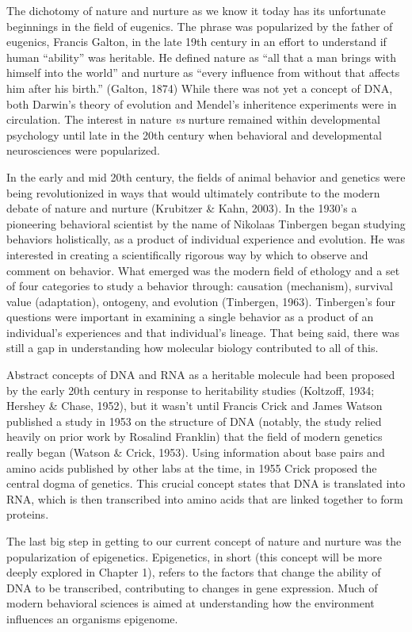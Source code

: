 \documentclass[12pt,twoside]{reedthesis}
\begin{document}
The dichotomy of nature and nurture as we know it today has its unfortunate beginnings in
the field of eugenics. The phrase was popularized by the father of eugenics, Francis
Galton, in the late 19th century in an effort to understand if human ``ability''
was heritable. He defined nature as ``all that a man brings with himself into
the world'' and nurture as ``every influence from without that affects him after
his birth.'' (Galton, 1874) While there was not yet a concept of DNA, both
Darwin's theory of evolution and Mendel's inheritence experiments were in
circulation. The interest in nature \textit{vs} nurture remained within developmental
psychology until late in the 20th century when behavioral and developmental
neurosciences were popularized.

In the early and mid 20th century, the fields of animal behavior and
genetics were being revolutionized in ways that would ultimately contribute to the modern debate of
nature and nurture (Krubitzer \& Kahn, 2003). In the 1930's a pioneering behavioral scientist by the name of Nikolaas Tinbergen began
studying behaviors holistically, as a product of individual
experience and evolution. He was interested in creating a scientifically
rigorous way by which to observe and comment on behavior.
What emerged was the modern field of ethology and a set of four categories to
study a behavior through: causation (mechanism), survival value (adaptation),
ontogeny, and evolution (Tinbergen, 1963).
Tinbergen's four questions were important in examining a single behavior as a product of an
individual's experiences and that individual's lineage. That being said, there
was still a gap in understanding how molecular biology contributed to all of this.

Abstract concepts of DNA and RNA as a heritable molecule had been proposed by the early 20th century in response to heritability
studies (Koltzoff, 1934; Hershey \& Chase, 1952), but it wasn't until
Francis Crick and James Watson published a study in 1953 on the structure of DNA
(notably, the 
study relied heavily on prior work by Rosalind Franklin) that
the field of modern genetics really began (Watson \& Crick, 1953). Using
information about base pairs and amino acids published by other labs at the
time, in 1955 Crick proposed the
central dogma of genetics. This crucial concept states that DNA is translated into RNA, which is then
transcribed into amino acids that are linked together to form proteins.

The last big step in getting to our current concept of nature and nurture was
the popularization of epigenetics. Epigenetics, in short (this concept will be
more deeply explored in Chapter 1), refers to
the factors that change the ability of DNA to be transcribed, contributing to
changes in gene expression. Much of modern behavioral sciences is aimed at understanding
how the environment influences an organisms epigenome. 
\end{document}
